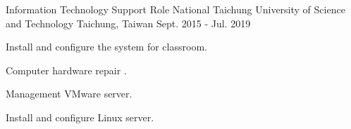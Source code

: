 \begin{cventries}
  \cventry
    {Information Technology Support Role} %
    {National Taichung University of Science and Technology} %
    {Taichung, Taiwan} %
    {Sept. 2015 - Jul. 2019} %
    {
      \begin{cvitems} %
        \item {Install and configure the system for classroom.}
        \item {Computer hardware repair .}
        \item {Management VMware server.}
        \item {Install and configure Linux server.}
      \end{cvitems}
    }
    
\end{cventries}